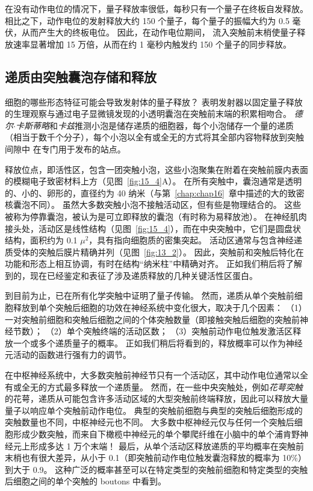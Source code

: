 在没有动作电位的情况下，量子释放率很低，每秒只有一个量子在终板自发释放。
相比之下，动作电位的发射释放大约 150 个量子，每个量子的振幅大约为 0.5 毫伏，从而产生大的终板电位。
因此，在动作电位期间， 流入突触前末梢使量子释放速率显著增加 15 万倍，从而在约 1 毫秒内触发约 150 个量子的同步释放。



\subsection{递质由突触囊泡存储和释放}

细胞的哪些形态特征可能会导致发射体的量子释放？
表明发射器以固定量子释放的生理观察与通过电子显微镜发现的小透明囊泡在突触前末端的积累相吻合。
\textit{德尔$\cdot$卡斯蒂略}和\textit{卡兹}推测小泡是储存递质的细胞器，每个小泡储存一个量的递质（相当于数千个分子），每个小泡以全有或全无的方式将其全部内容物释放到突触间隙中 在专门用于发布的站点。


释放位点，即活性区，包含一团突触小泡，这些小泡聚集在附着在突触前膜内表面的模糊电子致密材料上方（见图~\ref{fig:15_4}A）。
在所有突触中，囊泡通常是透明的、小的、卵形的，直径约为 40 纳米（与第~\ref{chap:chap16}~章中描述的大的致密核囊泡不同）。
虽然大多数突触小泡不接触活动区，但有些是物理结合的。
这些被称为停靠囊泡，被认为是可立即释放的囊泡（有时称为易释放池）。
在神经肌肉接头处，活动区是线性结构（见图~\ref{fig:15_4}），而在中央突触中，它们是圆盘状结构，面积约为 0.1 $ \mu^2 $，具有指向细胞质的密集突起。
活动区通常与包含神经递质受体的突触后膜片精确并列（见图~\ref{fig:13_2}）。
因此，突触前和突触后特化在功能和形态上相互协调，有时在结构“纳米柱”中精确对齐。 
正如我们稍后将了解到的，现在已经鉴定和表征了涉及递质释放的几种关键活性区蛋白。


到目前为止，已在所有化学突触中证明了量子传输。
然而，递质从单个突触前细胞释放到单个突触后细胞的功效在神经系统中变化很大，取决于几个因素：
（1）一对突触前细胞和突触后细胞之间的个体突触数量（即接触突触后细胞的突触前神经节数）；
（2）单个突触终端的活动区数；
（3）突触前动作电位触发激活区释放一个或多个递质量子的概率。
正如我们稍后将看到的，释放概率可以作为神经元活动的函数进行强有力的调节。


在中枢神经系统中，大多数突触前神经节只有一个活动区，其中动作电位通常以全有或全无的方式最多释放一个递质量。
然而，在一些中央突触处，例如\textit{花萼突触}的花萼，递质从可能包含许多活动区域的大型突触前终端释放，因此可以释放大量量子以响应单个突触前动作电位。
典型的突触前细胞与典型的突触后细胞形成的突触数量也不同，中枢神经元也不同。
大多数中枢神经元仅与任何一个突触后细胞形成少数突触，而来自下橄榄中神经元的单个攀爬纤维在小脑中的单个浦肯野神经元上形成多达 1 万个末端！
最后，从单个活动区释放递质的平均概率在突触前末梢也有很大差异，从小于 0.1（即突触前动作电位触发囊泡释放的概率为 10\%）到大于 0.9。
这种广泛的概率甚至可以在特定类型的突触前细胞和特定类型的突触后细胞之间的单个突触的 boutons 中看到。


